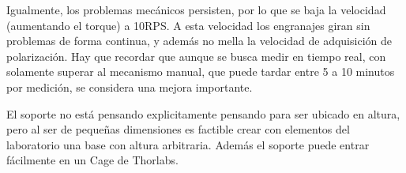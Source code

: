Igualmente, los problemas mecánicos persisten, por lo que se baja la velocidad (aumentando el torque) a 10RPS. A esta velocidad los engranajes giran sin problemas de forma continua, y además no mella la velocidad de adquisición de polarización. Hay que recordar que aunque  se busca medir en tiempo real, con solamente superar al mecanismo manual, que puede tardar entre 5 a 10 minutos por medición, se considera una mejora importante.

El soporte no está pensando explicitamente pensando para ser ubicado en altura, pero al ser de pequeñas dimensiones es factible crear con elementos del laboratorio una base con altura arbitraria. Además el soporte puede entrar fácilmente en un Cage de Thorlabs.
